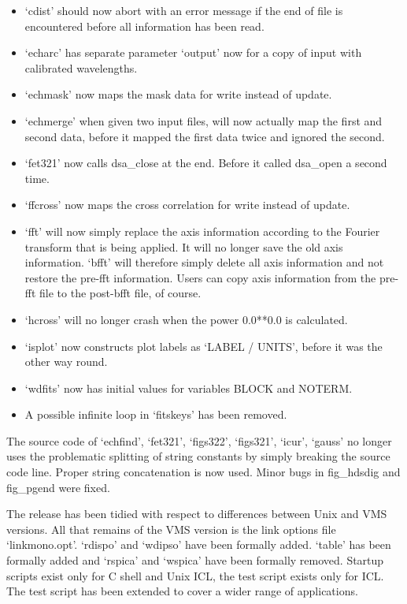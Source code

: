 \begin{itemize}
\item `cdist' should now abort with an error message if the end of file is
      encountered before all information has been read.
\item `echarc' has separate parameter `output' now for a copy of input with
      calibrated wavelengths.
\item `echmask' now maps the mask data for write instead of update.
\item `echmerge' when given two input files, will now actually map the first
      and second data, before it mapped the first data twice and ignored the
      second.
\item `fet321' now calls dsa\_close at the end.  Before it called dsa\_open a
      second time.
\item `ffcross' now maps the cross correlation for write instead of update.
\item `fft' will now simply replace the axis information according to the
      Fourier transform that is being applied.  It will no longer save the
      old axis information.  `bfft' will therefore simply delete all axis
      information and not restore the pre-fft information.  Users can copy
      axis information from the pre-fft file to the post-bfft file, of
      course.
\item `hcross' will no longer crash when the power 0.0**0.0 is calculated.
\item `isplot' now constructs plot labels as `LABEL / UNITS', before it was
      the other way round.
\item `wdfits' now has initial values for variables BLOCK and NOTERM.
\item A possible infinite loop in `fitskeys' has been removed.
\end{itemize}

   The source code of `echfind', `fet321', `figs322', `figs321',
   `icur', `gauss' no longer uses the problematic splitting of string
   constants by simply breaking the source code line.  Proper string
   concatenation is now used. Minor bugs in fig\_hdsdig and fig\_pgend
   were fixed.

   The release has been tidied with respect to differences between Unix and
   VMS versions.  All that remains of the VMS version is the link options
   file `linkmono.opt'.  `rdispo' and `wdipso' have been formally
   added.  `table' has been formally added and `rspica' and `wspica'
   have been formally removed. Startup scripts exist only for C shell
   and Unix ICL, the test script exists only for ICL.  The test script
   has been extended to cover a wider range of applications.


